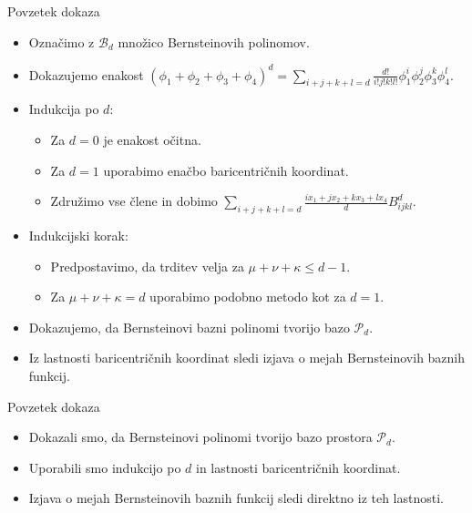 \documentclass{beamer}
\begin{document}
\begin{frame}{Povzetek dokaza}
    \begin{itemize}
        \item Označimo z $\mathcal{B}_d$ množico Bernsteinovih polinomov.
        \item Dokazujemo enakost $\left( \phi_1 + \phi_2 + \phi_3 + \phi_4 \right)^d = \sum_{i+j+k+l = d} \frac{d!}{i!j!k!l!} \phi_1^i \phi_2^j \phi_3^k \phi_4^l$.
        \item Indukcija po $d$:
        \begin{itemize}
            \item Za $d = 0$ je enakost očitna.
            \item Za $d = 1$ uporabimo enačbo baricentričnih koordinat.
            \item Združimo vse člene in dobimo $\sum_{i+j+k+l = d} \frac{ix_1 + jx_2 + k x_3 + l x_4}{d} B_{ijkl}^d$.
        \end{itemize}
        \item Indukcijski korak:
        \begin{itemize}
            \item Predpostavimo, da trditev velja za $\mu + \nu + \kappa \leq d-1$.
            \item Za $\mu + \nu + \kappa = d$ uporabimo podobno metodo kot za $d = 1$.
        \end{itemize}
        \item Dokazujemo, da Bernsteinovi bazni polinomi tvorijo bazo $\mathcal{P}_d$.
        \item Iz lastnosti baricentričnih koordinat sledi izjava o mejah Bernsteinovih baznih funkcij.
    \end{itemize}
\end{frame}

\begin{frame}{Povzetek dokaza}
    \begin{itemize}
        \item Dokazali smo, da Bernsteinovi polinomi tvorijo bazo prostora $\mathcal{P}_d$.
        \item Uporabili smo indukcijo po $d$ in lastnosti baricentričnih koordinat.
        \item Izjava o mejah Bernsteinovih baznih funkcij sledi direktno iz teh lastnosti.
    \end{itemize}
\end{frame}
\end{document}
